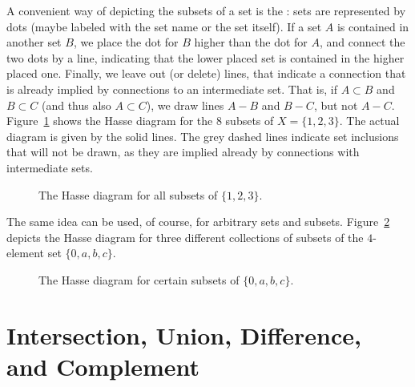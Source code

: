 A convenient way of depicting the subsets of a set is the : sets are represented by dots (maybe labeled with the set name or
the set itself). If a set $A$ is contained in another set $B$, we place the
dot for $B$ higher than the dot for $A$, and connect the two dots by a line,
indicating that the lower placed set is contained in the higher placed one.
Finally, we leave out (or delete) lines, that indicate a connection that is
already implied by connections to an intermediate set. That is, if $A\subset
B$ and $B\subset C$ (and thus also $A\subset C$), we draw lines $A-B$ and
$B-C$, but not $A-C$. Figure~\ref{fighasse3set} shows the Hasse diagram for
the $8$ subsets of $X=\{1,2,3\}$. The actual diagram is given by the solid
lines. The grey dashed lines indicate set inclusions that will not be drawn,
as they are implied already by connections with intermediate sets.

\begin{figure}[t]
\begin{center}
\end{center}
\caption{The Hasse diagram for all subsets of $\{1,2,3\}$.}
\label{fighasse3set}
\end{figure}

The same idea can be used, of course, for arbitrary sets and subsets.
Figure~\ref{fighasseV4} depicts the Hasse diagram for three different
collections of subsets of the $4$-element set $\{0,a,b,c\}$.

\begin{figure}[t]
\begin{center}
\end{center}
\caption{The Hasse diagram for certain subsets of $\{0,a,b,c\}$.}
\label{fighasseV4}
\end{figure}



\section{Intersection, Union, Difference, and Complement}

